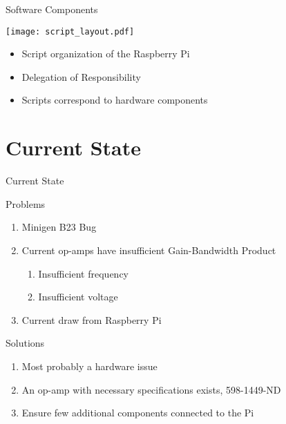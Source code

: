 \begin{frame}{Software Components}
\begin{multicols}{2}

\texttt{[image: script\_layout.pdf]}

\newpage

\begin{itemize}
  \item Script organization of the Raspberry Pi
  \item Delegation of Responsibility
  \item Scripts correspond to hardware components
\end{itemize}

\end{multicols}
\end{frame}

\section{Current State}

\begin{frame}{Current State}
  \begin{block}{Problems}
    \begin{enumerate}
      \item Minigen B23 Bug
      \item Current op-amps have insufficient Gain-Bandwidth Product
        \begin{enumerate}
        \item Insufficient frequency
        \item Insufficient voltage
        \end{enumerate}
      \item Current draw from Raspberry Pi
    \end{enumerate}
  \end{block}

  \begin{block}{Solutions}
    \begin{enumerate}
      \item Most probably a hardware issue
      \item An op-amp with necessary specifications exists, 598-1449-ND
      \item Ensure few additional components connected to the Pi
    \end{enumerate}
  \end{block}
\end{frame}

